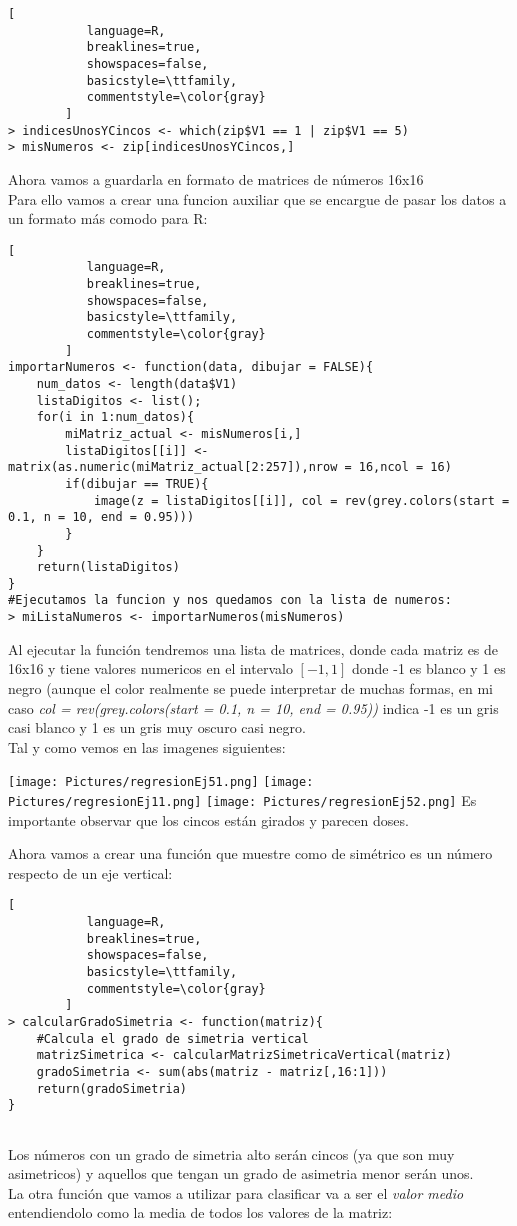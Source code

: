 \documentclass[11pt,fleqn]{book} %
\begin{document}
\begin{lstlisting}[
           language=R,
           breaklines=true,
           showspaces=false,
           basicstyle=\ttfamily,
           commentstyle=\color{gray}
        ]
> indicesUnosYCincos <- which(zip$V1 == 1 | zip$V1 == 5)
> misNumeros <- zip[indicesUnosYCincos,]
\end{lstlisting}
Ahora vamos a guardarla en formato de matrices de números 16x16\\
Para ello vamos a crear una funcion auxiliar que se encargue de pasar los datos a un formato más comodo para R:
\pagebreak
\begin{lstlisting}[
           language=R,
           breaklines=true,
           showspaces=false,
           basicstyle=\ttfamily,
           commentstyle=\color{gray}
        ]
importarNumeros <- function(data, dibujar = FALSE){
    num_datos <- length(data$V1)
    listaDigitos <- list();
    for(i in 1:num_datos){
        miMatriz_actual <- misNumeros[i,]
        listaDigitos[[i]] <- matrix(as.numeric(miMatriz_actual[2:257]),nrow = 16,ncol = 16)
        if(dibujar == TRUE){
            image(z = listaDigitos[[i]], col = rev(grey.colors(start = 0.1, n = 10, end = 0.95)))
        }
    }
    return(listaDigitos)
}
#Ejecutamos la funcion y nos quedamos con la lista de numeros:
> miListaNumeros <- importarNumeros(misNumeros)
\end{lstlisting}
Al ejecutar la función tendremos una lista de matrices, donde cada matriz es de 16x16 y tiene valores numericos en el intervalo $[-1,1]$ donde -1 es blanco y 1 es negro (aunque el color realmente se puede interpretar de muchas formas, en mi caso \textit{col = rev(grey.colors(start = 0.1, n = 10, end = 0.95))} indica -1 es un gris casi blanco y 1 es un gris muy oscuro casi negro.\\
Tal y como vemos en las imagenes siguientes:

\texttt{[image: Pictures/regresionEj51.png]}
\texttt{[image: Pictures/regresionEj11.png]}
\texttt{[image: Pictures/regresionEj52.png]}
Es importante observar que los cincos están girados y parecen doses.

Ahora vamos a crear una función que muestre como de simétrico es un número respecto de un eje vertical:

\begin{lstlisting}[
           language=R,
           breaklines=true,
           showspaces=false,
           basicstyle=\ttfamily,
           commentstyle=\color{gray}
        ]  
> calcularGradoSimetria <- function(matriz){
    #Calcula el grado de simetria vertical
    matrizSimetrica <- calcularMatrizSimetricaVertical(matriz)
    gradoSimetria <- sum(abs(matriz - matriz[,16:1]))
    return(gradoSimetria)
}   
    
\end{lstlisting}
Los números con un grado de simetria alto serán cincos (ya que son muy asimetricos) y aquellos que tengan un grado de asimetria menor serán unos.\\
La otra función que vamos a utilizar para clasificar va a ser el \textit{valor medio} entendiendolo como la media de todos los valores de la matriz:
\end{document}
